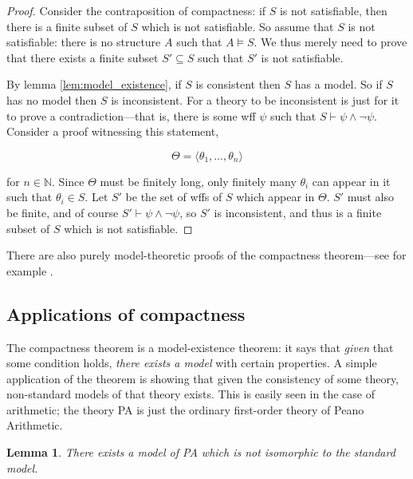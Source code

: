 \documentclass[10pt, a4paper, oneside]{article}
\theoremstyle{definition}
\theoremstyle{remark}
\theoremstyle{plain}
\newtheorem{lem}[thm]{Lemma}
\theoremstyle{plain}
\begin{document}
\begin{proof}
    Consider the contraposition of compactness: if $S$ is not satisfiable, then
    there is a finite subset of $S$ which is not satisfiable. So assume that $S$
    is not satisfiable: there is no structure $A$ such that $A \models S$. We
    thus merely need to prove that there exists a finite subset $S' \subseteq S$
    such that $S'$ is not satisfiable.
    
    By lemma \ref{lem:model_existence}, if $S$ is consistent then $S$ has a
    model. So if $S$ has no model then $S$ is inconsistent. For a theory to be
    inconsistent is just for it to prove a contradiction---that is, there is
    some wff $\psi$ such that $S \vdash \psi \wedge \neg\psi$. Consider a proof
    witnessing this statement,
    
    \begin{equation}
        \Theta = \langle \theta_1, \dotsc, \theta_n \rangle
    \end{equation}
    
    for $n \in \mathbb{N}$. Since $\Theta$ must be finitely long, only finitely
    many $\theta_i$ can appear in it such that $\theta_i \in S$. Let $S'$ be the
    set of wffs of $S$ which appear in $\Theta$. $S'$ must also be finite, and
    of course $S' \vdash \psi \wedge \neg\psi$, so $S'$ is inconsistent, and
    thus is a finite subset of $S$ which is not satisfiable.
\end{proof}

There are also purely model-theoretic proofs of the compactness theorem---see
for example \citet[pp. 125--127]{hodges1997}.

\subsection{Applications of compactness}

The compactness theorem is a model-existence theorem: it says that \emph{given}
that some condition holds, \emph{there exists a model} with certain properties.
A simple application of the theorem is showing that given the consistency of
some theory, non-standard models of that theory exists. This is easily seen in
the case of arithmetic; the theory PA is just the ordinary first-order theory of
Peano Arithmetic.

\begin{lem}
    There exists a model of PA which is not isomorphic to the standard model.
\end{lem}
\end{document}

